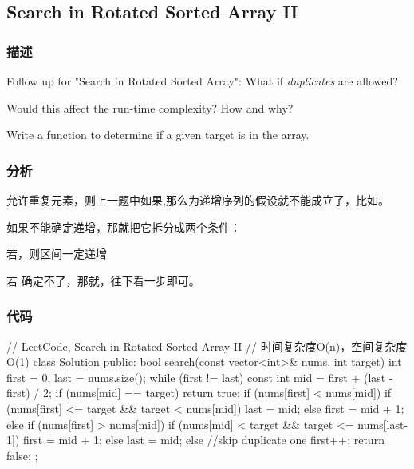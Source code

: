 \subsection{Search in Rotated Sorted Array II}
\label{sec:search-in-rotated-sorted-array-ii}


\subsubsection{描述}
Follow up for "Search in Rotated Sorted Array": What if \emph{duplicates} are allowed?

Would this affect the run-time complexity? How and why?

Write a function to determine if a given target is in the array.


\subsubsection{分析}
允许重复元素，则上一题中如果,那么\fn{[l,m]}为递增序列的假设就不能成立了，比如\code{[1,3,1,1,1]}。

如果不能确定递增，那就把它拆分成两个条件：
\begindot
\item 若，则区间\fn{[l,m]}一定递增
\item 若 确定不了，那就，往下看一步即可。
\myenddot

\subsubsection{代码}
\begin{Code}
// LeetCode, Search in Rotated Sorted Array II
// 时间复杂度O(n)，空间复杂度O(1)
class Solution {
public:
    bool search(const vector<int>& nums, int target) {
        int first = 0, last = nums.size();
        while (first != last) {
            const int mid = first  + (last - first) / 2;
            if (nums[mid] == target)
                return true;
            if (nums[first] < nums[mid]) {
                if (nums[first] <= target && target < nums[mid])
                    last = mid;
                else
                    first = mid + 1;
            } else if (nums[first] > nums[mid]) {
                if (nums[mid] < target && target <= nums[last-1])
                    first = mid + 1;
                else
                    last = mid;
            } else
                //skip duplicate one
                first++;
        }
        return false;
    }
};
\end{Code}


